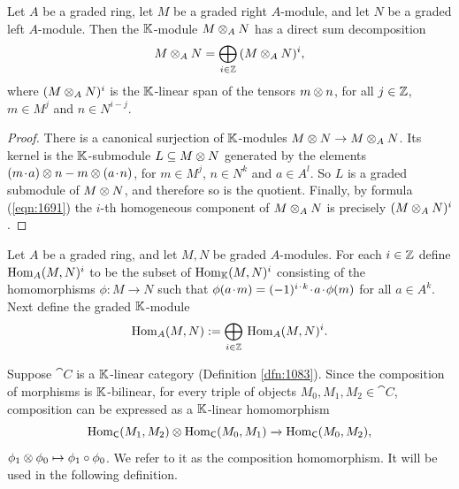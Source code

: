 \begin{lem} \label{lem:1690}
Let $A$ be a graded ring, let $M$ be a graded right $A$-module, 
and let $N$ be a graded left $A$-module. Then the $\mathbb{K}$-module 
$M \otimes_A N$ has a direct sum decomposition
\[ M \otimes_A N = \bigoplus_{i \in \mathbb{Z}} \, (M \otimes_A N)^i, \]
where $(M \otimes_A N)^i$ is the $\mathbb{K}$-linear span of the tensors $m \otimes n$, for 
all $j \in \mathbb{Z}$, $m \in M^j$ and  $n \in N^{i - j}$. 
\end{lem}

\begin{proof}
There is a canonical surjection of $\mathbb{K}$-modules 
$M \otimes N \to M \otimes_A N$.
Its kernel is the $\mathbb{K}$-submodule 
$L \subseteq M \otimes N$ generated by the elements 
$(m \mspace{1.5mu}{\cdot}\mspace{1.5mu} a) \otimes n - m \otimes (a \mspace{1.5mu}{\cdot}\mspace{1.5mu} n)$,
for $m \in M^j$, $n \in N^k$ and $a \in A^l$.
So $L$ is a graded submodule of  $M \otimes N$, and therefore so is the 
quotient. Finally, by formula (\ref{eqn:1691}) the $i$-th homogeneous component 
of $M \otimes_A N$ is precisely  $(M \otimes_A N)^i$. 
\end{proof}

\begin{dfn} \label{dfn:1690}
Let $A$ be a graded ring, and let $M, N$ be graded $A$-modules.
For each $i \in \mathbb{Z}$ define $\operatorname{Hom}_{A}(M, N)^i$ to be the subset of 
$\operatorname{Hom}_{\mathbb{K}}(M, N)^i$ consisting of the homomorphisms $\phi : M \to N$ such 
that
$\phi(a \mspace{1.5mu}{\cdot}\mspace{1.5mu} m) = (-1)^{i \mspace{1.5mu}{\cdot}\mspace{1.5mu} k} \mspace{1.5mu}{\cdot}\mspace{1.5mu} a \mspace{1.5mu}{\cdot}\mspace{1.5mu} \phi(m)$
for all $a \in A^k$. Next define the graded $\mathbb{K}$-module
\[ \operatorname{Hom}_{A}(M, N) := \bigoplus_{i \in \mathbb{Z}} \, \operatorname{Hom}_{A}(M, N)^i . \]
\end{dfn}

Suppose $\cat{C}$ is a $\mathbb{K}$-linear category (Definition \ref{dfn:1083}).
Since the composition of morphisms is $\mathbb{K}$-bilinear, for every  
triple of objects $M_0, M_1, M_2 \in \cat{C}$, composition can be expressed as
a $\mathbb{K}$-linear homomorphism 
\[ \operatorname{Hom}_{\operatorname{\mathsf{C}}}(M_1, M_2) \otimes 
\operatorname{Hom}_{\operatorname{\mathsf{C}}}(M_0, M_1) \xrightarrow{} 
\operatorname{Hom}_{\operatorname{\mathsf{C}}}(M_0, M_2) , \]
$\phi_1 \otimes \phi_0 \mapsto \phi_1 \circ \phi_0$.
We refer to it as the composition homomorphism. It will be used in the 
following definition. 

